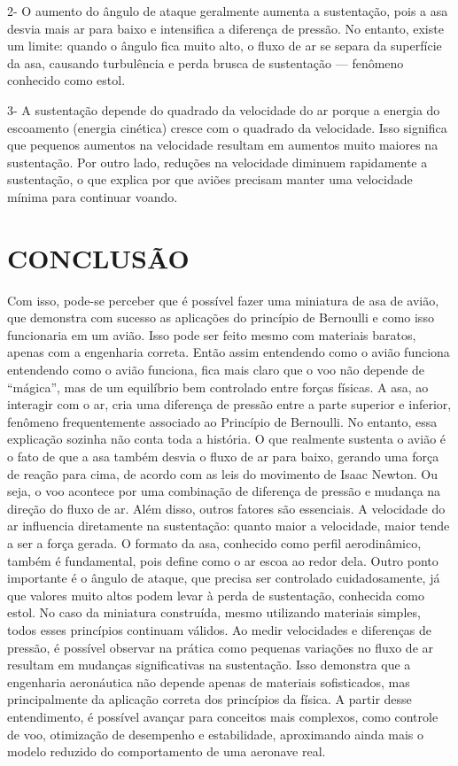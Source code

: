 \documentclass[12pt]{article}
\begin{document}
2- O aumento do ângulo de ataque geralmente aumenta a sustentação, pois a asa desvia mais ar para baixo e intensifica a diferença de pressão. No entanto, existe um limite: quando o ângulo fica muito alto, o fluxo de ar se separa da superfície da asa, causando turbulência e perda brusca de sustentação — fenômeno conhecido como estol.

3- A sustentação depende do quadrado da velocidade do ar porque a energia do escoamento (energia cinética) cresce com o quadrado da velocidade. Isso significa que pequenos aumentos na velocidade resultam em aumentos muito maiores na sustentação. Por outro lado, reduções na velocidade diminuem rapidamente a sustentação, o que explica por que aviões precisam manter uma velocidade mínima para continuar voando.


\section{CONCLUSÃO}

Com isso, pode-se perceber que é possível fazer uma miniatura de asa de avião, que demonstra com sucesso as aplicações do princípio de Bernoulli e como isso funcionaria em um avião.  Isso pode ser feito mesmo com materiais baratos, apenas com a engenharia correta. Então assim entendendo como o avião funciona entendendo como o avião funciona, fica mais claro que o voo não depende de “mágica”, mas de um equilíbrio bem controlado entre forças físicas.
A asa, ao interagir com o ar, cria uma diferença de pressão entre a parte superior e inferior, fenômeno frequentemente associado ao Princípio de Bernoulli. No entanto, essa explicação sozinha não conta toda a história. O que realmente sustenta o avião é o fato de que a asa também desvia o fluxo de ar para baixo, gerando uma força de reação para cima, de acordo com as leis do movimento de Isaac Newton.
Ou seja, o voo acontece por uma combinação de diferença de pressão e mudança na direção do fluxo de ar.
Além disso, outros fatores são essenciais. A velocidade do ar influencia diretamente na sustentação: quanto maior a velocidade, maior tende a ser a força gerada. O formato da asa, conhecido como perfil aerodinâmico, também é fundamental, pois define como o ar escoa ao redor dela. Outro ponto importante é o ângulo de ataque, que precisa ser controlado cuidadosamente, já que valores muito altos podem levar à perda de sustentação, conhecida como estol.
No caso da miniatura construída, mesmo utilizando materiais simples, todos esses princípios continuam válidos. Ao medir velocidades e diferenças de pressão, é possível observar na prática como pequenas variações no fluxo de ar resultam em mudanças significativas na sustentação.
Isso demonstra que a engenharia aeronáutica não depende apenas de materiais sofisticados, mas principalmente da aplicação correta dos princípios da física. A partir desse entendimento, é possível avançar para conceitos mais complexos, como controle de voo, otimização de desempenho e estabilidade, aproximando ainda mais o modelo reduzido do comportamento de uma aeronave real.
\end{document}

